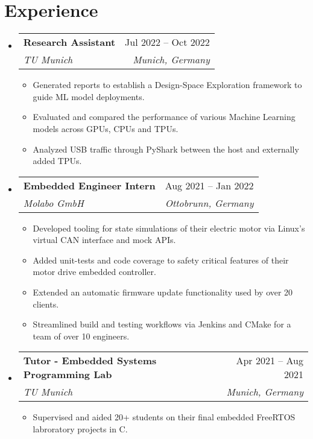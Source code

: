 \documentclass[letterpaper,11pt]{article}
\makeatletter
\newcommand{\resumeItem}[1]{
  \item\small{
    {#1 \vspace{-2pt}}
  }
}
\newcommand{\resumeSubheading}[4]{
  \vspace{-2pt}\item
    \begin{tabular*}{0.97\textwidth}[t]{l@{\extracolsep{\fill}}r}
      \textbf{#1} & #2 \\
      \textit{\small#3} & \textit{\small #4} \\
    \end{tabular*}\vspace{-7pt}
}
\newcommand{\resumeSubHeadingListStart}{\begin{itemize}[leftmargin=0.15in, label={}]}
\newcommand{\resumeSubHeadingListEnd}{\end{itemize}}
\newcommand{\resumeItemListStart}{\begin{itemize}}
\newcommand{\resumeItemListEnd}{\end{itemize}\vspace{-5pt}}
\makeatother
\begin{document}
\vspace{-8.0pt}

\section{Experience}
    \resumeSubHeadingListStart
        \resumeSubheading
            {Research Assistant}{Jul 2022 -- Oct 2022}
            {TU Munich}{Munich, Germany}
            \resumeItemListStart
                \resumeItem{Generated reports to establish a Design-Space Exploration framework to guide ML model deployments.}
                \resumeItem{Evaluated and compared the performance of various Machine Learning models across GPUs, CPUs and TPUs.}
                \resumeItem{Analyzed USB traffic through PyShark between the host and externally added TPUs.}
            \resumeItemListEnd
            \vspace{2.0pt}

        \resumeSubheading
            {Embedded Engineer Intern}{Aug 2021 -- Jan 2022}
            {Molabo GmbH}{Ottobrunn, Germany}
            \resumeItemListStart
                \resumeItem{Developed tooling for state simulations of their electric motor via Linux's virtual CAN interface and mock APIs.}
                \resumeItem{Added unit-tests and code coverage to safety critical features of their motor drive embedded controller.}
                \resumeItem{Extended an automatic firmware update functionality used by over 20 clients.}
                \resumeItem{Streamlined build and testing workflows via Jenkins and CMake for a team of over 10 engineers.}
            \resumeItemListEnd
            \vspace{2.0pt}

        \resumeSubheading
            {Tutor - Embedded Systems Programming Lab}{Apr 2021 -- Aug 2021}
            {TU Munich}{Munich, Germany}
            \resumeItemListStart
                \resumeItem{\small{Supervised and aided 20+ students on their final embedded FreeRTOS labroratory projects in C.}}
            \resumeItemListEnd
    \resumeSubHeadingListEnd 

\vspace{-8.0pt}
\end{document}
